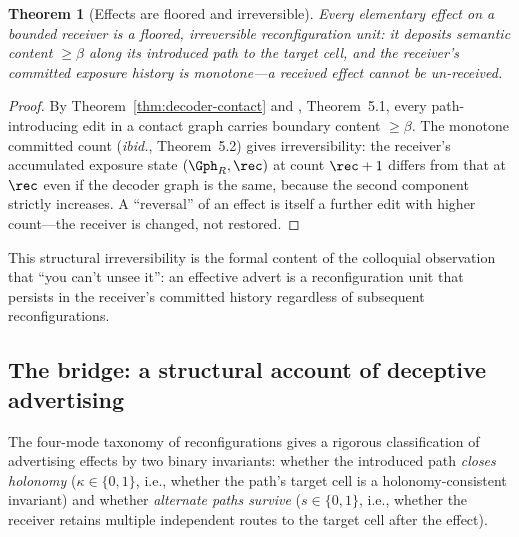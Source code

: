 \documentclass[twocolumn,11pt,a4paper]{article}
\theoremstyle{adv}
\newtheorem{theorem}{Theorem}[section]
\theoremstyle{definition}
\theoremstyle{remark}
\newcommand{\Recv}{R}                  %
\newcommand{\floor}{\beta}            %
\begin{document}
\begin{theorem}[Effects are floored and irreversible]
\label{thm:effect-unit}
Every elementary effect on a bounded receiver is a floored, irreversible
reconfiguration unit: it deposits semantic content $\ge\floor$ along its
introduced path to the target cell, and the receiver's committed exposure
history is monotone---a received effect cannot be un-received.
\end{theorem}

\begin{proof}
By Theorem~\ref{thm:decoder-contact} and \citet{sachikonye2025knowledge},
Theorem~5.1, every path-introducing edit in a contact graph carries boundary
content $\ge\floor$. The monotone committed count (\textit{ibid.}, Theorem~5.2)
gives irreversibility: the receiver's accumulated exposure state
$(\Gph_\Recv,\rec)$ at count $\rec+1$ differs from that at $\rec$ even if the
decoder graph is the same, because the second component strictly increases. A
``reversal'' of an effect is itself a further edit with higher count---the
receiver is changed, not restored.
\end{proof}

This structural irreversibility is the formal content of the colloquial
observation that ``you can't unsee it'': an effective advert is a reconfiguration
unit that persists in the receiver's committed history regardless of subsequent
reconfigurations.

\subsection{The bridge: a structural account of deceptive advertising}

The four-mode taxonomy of reconfigurations \citep{sachikonye2025knowledge}
gives a rigorous classification of advertising effects by two binary invariants:
whether the introduced path \emph{closes holonomy} ($\kappa\in\{0,1\}$, i.e.,
whether the path's target cell is a holonomy-consistent invariant) and whether
\emph{alternate paths survive} ($s\in\{0,1\}$, i.e., whether the receiver
retains multiple independent routes to the target cell after the effect).
\end{document}
